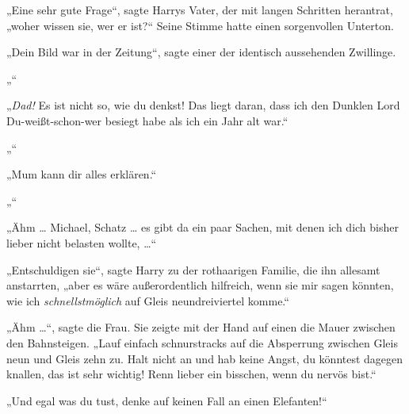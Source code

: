 „Eine sehr gute Frage“, sagte Harrys Vater, der mit langen Schritten herantrat, „woher wissen sie, wer er ist?“ Seine Stimme hatte einen sorgenvollen Unterton.

„Dein Bild war in der Zeitung“, sagte einer der identisch aussehenden Zwillinge.

„“

„\emph{Dad!} Es ist nicht so, wie du denkst! Das liegt daran, dass ich den Dunklen Lord Du-weißt-schon-wer besiegt habe als ich ein Jahr alt war.“

„“

„Mum kann dir alles erklären.“

„“

„Ähm … Michael, Schatz … es gibt da ein paar Sachen, mit denen ich dich bisher lieber nicht belasten wollte, …“

„Entschuldigen sie“, sagte Harry zu der rothaarigen Familie, die ihn allesamt anstarrten, „aber es wäre außerordentlich hilfreich, wenn sie mir sagen könnten, wie ich \emph{schnellstmöglich} auf Gleis neundreiviertel komme.“

„Ähm …“, sagte die Frau. Sie zeigte mit der Hand auf einen die Mauer zwischen den Bahnsteigen.
„Lauf einfach schnurstracks auf die Absperrung zwischen Gleis neun und Gleis zehn zu. Halt nicht an und hab keine Angst, du könntest dagegen knallen, das ist sehr wichtig! Renn lieber ein bisschen, wenn du nervös bist.“

„Und egal was du tust, denke auf keinen Fall an einen Elefanten!“

